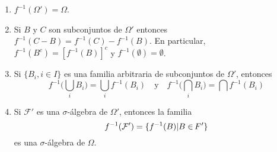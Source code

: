 \documentclass[10pt,a4paper]{article}
\begin{document}
\begin{enumerate}
	\begin{enumerate}
		\item $f^{-1}(\Omega') = \Omega$.
		\item Si $B$ y $C$ son subconjuntos de $\Omega'$ entonces $f^{-1}(C-B)=f^{-1}(C)-f^{-1}(B)$. En particular, $f^{-1}(B^{c}) = [f^{-1}(B)]^{c}$ y $f^{-1}(\emptyset)= \emptyset$.
		\item Si $\{ B_i, i \in I\}$ es una familia arbitraria de subconjuntos de $\Omega'$, entonces
		\[
		f^{-1} \Big( \bigcup_{i} B_i \Big) = \bigcup_{i} f^{-1}(B_i) \quad \text{y} \quad f^{-1} \Big( \bigcap_{i} B_i \Big) = \bigcap f^{-1} (B_i)
		\]
		\item Si $\mathcal{F}'$ es una $\sigma$-álgebra de $\Omega'$, entonces la familia
		\[
		f^{-1} (\mathcal{F} ') = \{ f^{-1} (B) | B \in \hspace{1mm} \mathclap{F}\hspace{1.5mm} '\}
		\]
		es una $\sigma$-álgebra de $\Omega$.
	\end{enumerate}
	
	
\end{enumerate}
\end{document}

